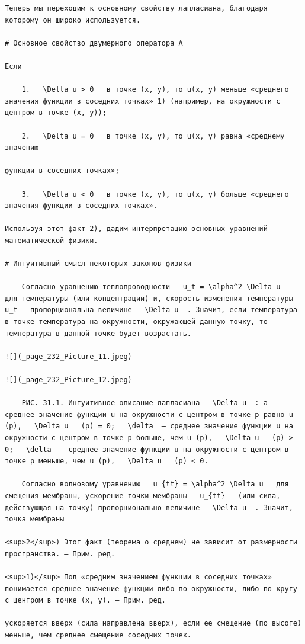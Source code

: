 \documentclass[
]{article}
\begin{document}
\begin{verbatim}
Теперь мы переходим к основному свойству лапласиана, благодаря которому он широко используется.

# Основное свойство двумерного оператора А

Если

    1.   \Delta u > 0   в точке (x, y), то u(x, y) меньше «среднего значения функции в соседних точках» 1) (например, на окружности с центром в точке (x, y));

    2.   \Delta u = 0   в точке (x, y), то u(x, y) равна «среднему значению

функции в соседних точках»;

    3.   \Delta u < 0   в точке (x, y), то u(x, y) больше «среднего значения функции в соседних точках».

Используя этот факт 2), дадим интерпретацию основных уравнений математической физики.

# Интуитивный смысл некоторых законов физики

    Согласно уравнению теплопроводности   u_t = \alpha^2 \Delta u   для температуры (или концентрации) и, скорость изменения температуры   u_t   пропорциональна величине   \Delta u  . Значит, если температура в точке температура на окружности, окружающей данную точку, то температура в данной точке будет возрастать.

![](_page_232_Picture_11.jpeg)

![](_page_232_Picture_12.jpeg)

    РИС. 31.1. Интуитивное описание лапласиана   \Delta u  : a— среднее значение функции u на окружности с центром в точке p равно u (p),   \Delta u   (p) = 0;   \delta  — среднее значение функции u на окружности с центром в точке p больше, чем u (p),   \Delta u   (p) > 0;   \delta  — среднее значение функции u на окружности с центром в точке p меньше, чем u (p),   \Delta u   (p) < 0.

    Согласно волновому уравнению   u_{tt} = \alpha^2 \Delta u   для смещения мембраны, ускорение точки мембраны   u_{tt}   (или сила, действующая на точку) пропорционально величине   \Delta u  . Значит, точка мембраны

<sup>2</sup>) Этот факт (теорема о среднем) не зависит от размерности пространства. — Прим. ред.

<sup>1)</sup> Под «средним значением функции в соседних точках» понимается среднее значение функции либо по окружности, либо по кругу с центром в точке (x, y). — Прим. ред.

ускоряется вверх (сила направлена вверх), если ее смещение (по высоте) меньше, чем среднее смещение соседних точек.


\end{verbatim}
\end{document}
